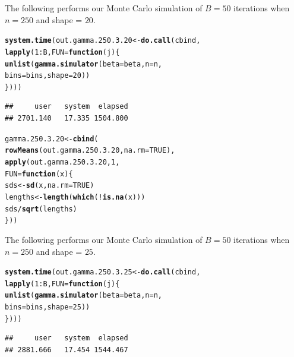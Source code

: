 \documentclass[11pt]{article}\usepackage[]{graphicx}\usepackage[]{color}
\makeatletter
\newcommand{\hlnum}[1]{\textcolor[rgb]{0.686,0.059,0.569}{#1}}%
\newcommand{\hlopt}[1]{\textcolor[rgb]{0,0,0}{#1}}%
\newcommand{\hlstd}[1]{\textcolor[rgb]{0.345,0.345,0.345}{#1}}%
\newcommand{\hlkwa}[1]{\textcolor[rgb]{0.161,0.373,0.58}{\textbf{#1}}}%
\newcommand{\hlkwb}[1]{\textcolor[rgb]{0.69,0.353,0.396}{#1}}%
\newcommand{\hlkwc}[1]{\textcolor[rgb]{0.333,0.667,0.333}{#1}}%
\newcommand{\hlkwd}[1]{\textcolor[rgb]{0.737,0.353,0.396}{\textbf{#1}}}%
\newenvironment{kframe}{%
 \def\at@end@of@kframe{}%
 \ifinner\ifhmode%
  \def\at@end@of@kframe{\end{minipage}}%
  \begin{minipage}{\columnwidth}%
 \fi\fi%
 \def\FrameCommand##1{\hskip\@totalleftmargin \hskip-\fboxsep
 \colorbox{shadecolor}{##1}\hskip-\fboxsep
     \hskip-\linewidth \hskip-\@totalleftmargin \hskip\columnwidth}%
 \MakeFramed {\advance\hsize-\width
   \@totalleftmargin\z@ \linewidth\hsize
   \@setminipage}}%
 {\par\unskip\endMakeFramed%
 \at@end@of@kframe}
\newenvironment{knitrout}{}{} %
\makeatother
\begin{document}
The following performs our Monte Carlo simulation of $B = 50$ iterations 
when $n = 250$ and shape = $20$.

\begin{knitrout}
\color{fgcolor}\begin{kframe}
\begin{alltt}
\hlkwd{system.time}\hlstd{(out.gamma.250.3.20} \hlkwb{<-} \hlkwd{do.call}\hlstd{(cbind,}
  \hlkwd{lapply}\hlstd{(}\hlnum{1}\hlopt{:}\hlstd{B,} \hlkwc{FUN} \hlstd{=} \hlkwa{function}\hlstd{(}\hlkwc{j}\hlstd{)\{}
    \hlkwd{unlist}\hlstd{(}\hlkwd{gamma.simulator}\hlstd{(}\hlkwc{beta} \hlstd{= beta,} \hlkwc{n} \hlstd{= n,}
      \hlkwc{bins} \hlstd{= bins,} \hlkwc{shape} \hlstd{=} \hlnum{20}\hlstd{))}
\hlstd{\})))}
\end{alltt}
\begin{verbatim}
##     user   system  elapsed 
## 2701.140   17.335 1504.800
\end{verbatim}
\end{kframe}
\end{knitrout}

\begin{knitrout}
\color{fgcolor}\begin{kframe}
\begin{alltt}
\hlstd{gamma.250.3.20} \hlkwb{<-} \hlkwd{cbind}\hlstd{(}
  \hlkwd{rowMeans}\hlstd{(out.gamma.250.3.20,} \hlkwc{na.rm} \hlstd{=} \hlnum{TRUE}\hlstd{),}
  \hlkwd{apply}\hlstd{(out.gamma.250.3.20,} \hlnum{1}\hlstd{,}
  \hlkwc{FUN} \hlstd{=} \hlkwa{function}\hlstd{(}\hlkwc{x}\hlstd{)\{}
    \hlstd{sds} \hlkwb{<-} \hlkwd{sd}\hlstd{(x,} \hlkwc{na.rm} \hlstd{=} \hlnum{TRUE}\hlstd{)}
    \hlstd{lengths} \hlkwb{<-} \hlkwd{length}\hlstd{(}\hlkwd{which}\hlstd{(}\hlopt{!}\hlkwd{is.na}\hlstd{(x)))}
    \hlstd{sds} \hlopt{/} \hlkwd{sqrt}\hlstd{(lengths)}
  \hlstd{\}))}
\end{alltt}
\end{kframe}
\end{knitrout}

The following performs our Monte Carlo simulation of $B = 50$ iterations 
when $n = 250$ and shape = $25$.

\begin{knitrout}
\color{fgcolor}\begin{kframe}
\begin{alltt}
\hlkwd{system.time}\hlstd{(out.gamma.250.3.25} \hlkwb{<-} \hlkwd{do.call}\hlstd{(cbind,}
  \hlkwd{lapply}\hlstd{(}\hlnum{1}\hlopt{:}\hlstd{B,} \hlkwc{FUN} \hlstd{=} \hlkwa{function}\hlstd{(}\hlkwc{j}\hlstd{)\{}
    \hlkwd{unlist}\hlstd{(}\hlkwd{gamma.simulator}\hlstd{(}\hlkwc{beta} \hlstd{= beta,} \hlkwc{n} \hlstd{= n,}
      \hlkwc{bins} \hlstd{= bins,} \hlkwc{shape} \hlstd{=} \hlnum{25}\hlstd{))}
\hlstd{\})))}
\end{alltt}
\begin{verbatim}
##     user   system  elapsed 
## 2881.666   17.454 1544.467
\end{verbatim}
\end{kframe}
\end{knitrout}
\end{document}
